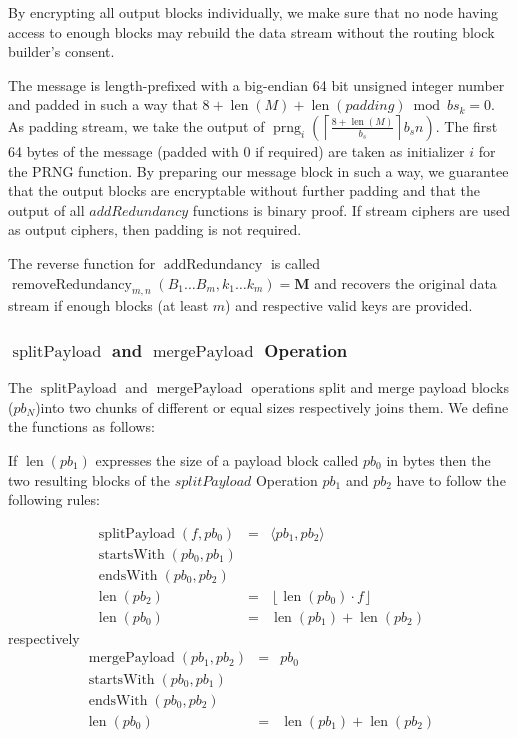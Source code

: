 \documentclass[runningheads]{llncs}
\DeclareMathOperator{\prng}{prng}
\DeclareMathOperator{\len}{len}
\DeclareMathOperator{\splitPayload}{splitPayload}
\DeclareMathOperator{\mergePayload}{mergePayload}
\DeclareMathOperator{\startsWith}{startsWith}
\DeclareMathOperator{\lendsWith}{endsWith}
\DeclareMathOperator{\addRedundancy}{addRedundancy}
\DeclareMathOperator{\removeRedundancy}{removeRedundancy}
\begin{document}
By encrypting all output blocks individually, we make sure that no node having access to enough blocks may rebuild the data stream without the routing block builder's consent.

The message is length-prefixed with a big-endian 64 bit unsigned integer number and padded in such a way that $8+\len(M)+\len(padding) \bmod bs_k =0$. As padding stream, we take the output of $\prng_i\left(\left\lceil\frac{8+\len(M)}{b_s}\right\rceil b_s n\right )$. The first 64 bytes of the message (padded with 0 if required) are taken as initializer $i$ for the PRNG function. By preparing our message block in such a way, we guarantee that the output blocks are encryptable without further padding and that the output of all $addRedundancy$ functions is binary proof. If stream ciphers are used as output ciphers, then padding is not required.

The reverse function for $\addRedundancy$ is called $\removeRedundancy_{m,n}(B_1\ldots B_{m},k_1\ldots k_{m})=\mathbf{M}$ and recovers the original data stream if enough blocks (at least $m$) and respective valid keys are provided. 

\subsubsection{$\splitPayload$ and $\mergePayload$ Operation}
The $\splitPayload$ and $\mergePayload$ operations split and merge payload blocks ($pb_N$)into two chunks of different or equal sizes respectively joins them. We define the functions as follows:

If $\len(pb_1)$ expresses the size of a payload block called $pb_0$ in bytes then the two resulting blocks of the $splitPayload$ Operation $pb_1$ and $pb_2$ have to follow the following rules:

\begin{eqnarray}
\splitPayload(f, pb_0) & = &\langle pb_1, pb_2 \rangle\\
\startsWith(pb_0, pb_1)\\
\lendsWith(pb_0, pb_2)\\
\len(pb_2) & = & \left\lfloor \len(pb_0)\cdot f\right \rfloor\\
\len(pb_0) & = & \len(pb_1) + \len(pb_2)
\end{eqnarray}
respectively
\begin{eqnarray}
\mergePayload(pb_1, pb_2) & = & pb_0 \\
\startsWith(pb_0, pb_1)\\
\lendsWith(pb_0, pb_2)\\
\len(pb_0) & = & \len(pb_1) + \len(pb_2)
\end{eqnarray}
\end{document}
